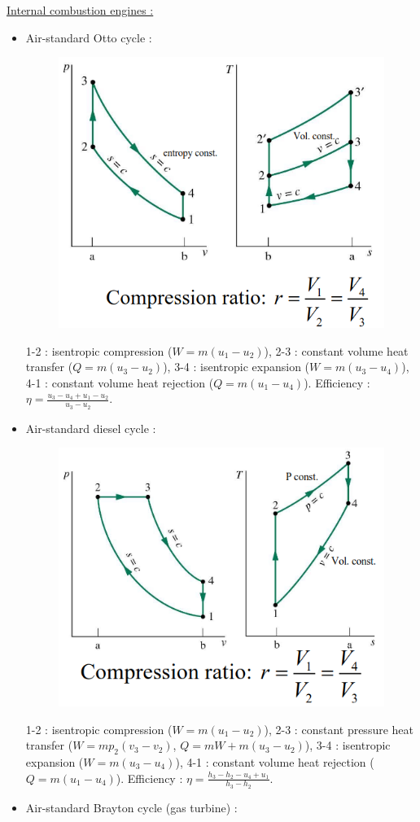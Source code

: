 \documentclass[../main.tex]{subfiles}
\begin{document}
\quad \underline{Internal combustion engines :}\\

\begin{itemize}
    \item Air-standard Otto cycle : \begin{figure}[hbt!]
        \centering
        \includegraphics[width=0.5\linewidth]{IMAGES/Renewable/Screenshot from 2025-02-25 21-57-41.png}
    \end{figure}
    1-2 : isentropic compression ($W = m(u_1-u_2)$), 2-3 : constant volume heat transfer ($Q = m(u_3-u_2)$), 3-4 : isentropic expansion ($W = m(u_3-u_4)$), 4-1 : constant volume heat rejection ($Q = m(u_1-u_4)$). Efficiency : $\eta = \frac{u_3-u_4+u_1-u_2}{u_3-u_2}$.
    \item Air-standard diesel cycle : \begin{figure}[hbt!]
        \centering
        \includegraphics[width=0.5\linewidth]{IMAGES/Renewable/Screenshot from 2025-02-25 22-00-44.png}
    \end{figure}
    1-2 : isentropic compression ($W = m(u_1-u_2)$), 2-3 : constant pressure heat transfer ($W = mp_2(v_3-v_2)$, $Q = mW + m(u_3-u_2)$), 3-4 : isentropic expansion ($W = m(u_3-u_4)$), 4-1 : constant volume heat rejection ($Q = m(u_1-u_4)$). Efficiency : $\eta = \frac{h_3-h_2-u_4+u_1}{h_3-h_2}$.
    \item Air-standard Brayton cycle (gas turbine) : \begin{figure}[hbt!]

\end{figure}
\end{itemize}
\end{document}
